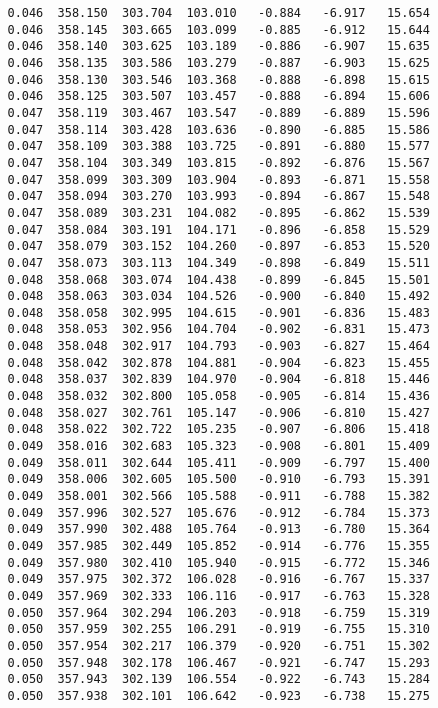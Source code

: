 \begin{verbatim}
   0.046  358.150  303.704  103.010   -0.884   -6.917   15.654
   0.046  358.145  303.665  103.099   -0.885   -6.912   15.644
   0.046  358.140  303.625  103.189   -0.886   -6.907   15.635
   0.046  358.135  303.586  103.279   -0.887   -6.903   15.625
   0.046  358.130  303.546  103.368   -0.888   -6.898   15.615
   0.046  358.125  303.507  103.457   -0.888   -6.894   15.606
   0.047  358.119  303.467  103.547   -0.889   -6.889   15.596
   0.047  358.114  303.428  103.636   -0.890   -6.885   15.586
   0.047  358.109  303.388  103.725   -0.891   -6.880   15.577
   0.047  358.104  303.349  103.815   -0.892   -6.876   15.567
   0.047  358.099  303.309  103.904   -0.893   -6.871   15.558
   0.047  358.094  303.270  103.993   -0.894   -6.867   15.548
   0.047  358.089  303.231  104.082   -0.895   -6.862   15.539
   0.047  358.084  303.191  104.171   -0.896   -6.858   15.529
   0.047  358.079  303.152  104.260   -0.897   -6.853   15.520
   0.047  358.073  303.113  104.349   -0.898   -6.849   15.511
   0.048  358.068  303.074  104.438   -0.899   -6.845   15.501
   0.048  358.063  303.034  104.526   -0.900   -6.840   15.492
   0.048  358.058  302.995  104.615   -0.901   -6.836   15.483
   0.048  358.053  302.956  104.704   -0.902   -6.831   15.473
   0.048  358.048  302.917  104.793   -0.903   -6.827   15.464
   0.048  358.042  302.878  104.881   -0.904   -6.823   15.455
   0.048  358.037  302.839  104.970   -0.904   -6.818   15.446
   0.048  358.032  302.800  105.058   -0.905   -6.814   15.436
   0.048  358.027  302.761  105.147   -0.906   -6.810   15.427
   0.048  358.022  302.722  105.235   -0.907   -6.806   15.418
   0.049  358.016  302.683  105.323   -0.908   -6.801   15.409
   0.049  358.011  302.644  105.411   -0.909   -6.797   15.400
   0.049  358.006  302.605  105.500   -0.910   -6.793   15.391
   0.049  358.001  302.566  105.588   -0.911   -6.788   15.382
   0.049  357.996  302.527  105.676   -0.912   -6.784   15.373
   0.049  357.990  302.488  105.764   -0.913   -6.780   15.364
   0.049  357.985  302.449  105.852   -0.914   -6.776   15.355
   0.049  357.980  302.410  105.940   -0.915   -6.772   15.346
   0.049  357.975  302.372  106.028   -0.916   -6.767   15.337
   0.049  357.969  302.333  106.116   -0.917   -6.763   15.328
   0.050  357.964  302.294  106.203   -0.918   -6.759   15.319
   0.050  357.959  302.255  106.291   -0.919   -6.755   15.310
   0.050  357.954  302.217  106.379   -0.920   -6.751   15.302
   0.050  357.948  302.178  106.467   -0.921   -6.747   15.293
   0.050  357.943  302.139  106.554   -0.922   -6.743   15.284
   0.050  357.938  302.101  106.642   -0.923   -6.738   15.275

\end{verbatim}
